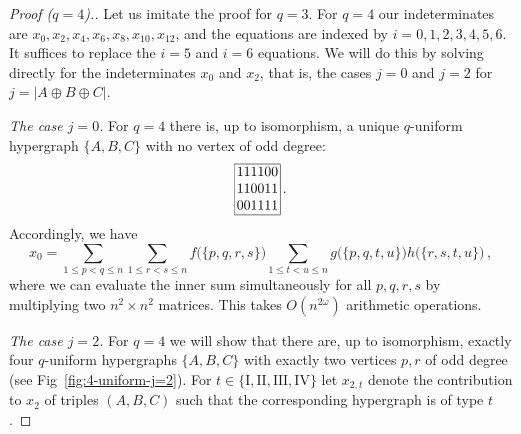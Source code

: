 \documentclass{amsart}
\begin{document}
\begin{proof}[Proof ($q=4$).]
Let us imitate the proof for $q=3$.
For $q=4$ our indeterminates are $x_0,x_2,x_4,x_6,x_8,x_{10},x_{12}$, 
and the equations are indexed by $i=0,1,2,3,4,5,6$. 
It suffices to replace the $i=5$ and $i=6$ equations. 
We will do this by solving directly for
the indeterminates $x_0$ and $x_2$, that is, the cases $j=0$ and $j=2$
for $j=|A\oplus B\oplus C|$.

{\em The case $j=0$.}
For $q=4$ there is, up to isomorphism, a unique 
$q$-uniform hypergraph $\{A,B,C\}$ with no vertex of odd degree:
\[
\begin{array}{|@{\,}c@{\,}|}
\hline
111100\\
110011\\
001111\\
\hline
\end{array}\,.
\]
Accordingly, we have
\[
x_0=\sum_{1\leq p<q\leq n}\sum_{1\leq r<s\leq n}f\bigl(\{p,q,r,s\}\bigr)\sum_{1\leq t<u\leq n}g\bigl(\{p,q,t,u\}\bigr)h\bigl(\{r,s,t,u\}\bigr)\,,
\]
where we can evaluate the inner sum simultaneously for all $p,q,r,s$ 
by multiplying two $n^2\times n^2$ matrices. This takes $O(n^{2\omega})$
arithmetic operations.



{\em The case $j=2$.}
For $q=4$ we will show that there are, up to isomorphism, exactly four 
$q$-uniform hypergraphs $\{A,B,C\}$ with exactly two
vertices $p,r$ of odd degree (see Fig~\ref{fig:4-uniform-j=2}).
For $t\in \{\mathrm{I},\mathrm{II},\mathrm{III},\mathrm{IV}\}$ let $x_{2,t}$ denote the contribution to $x_2$ of triples $(A,B,C)$ such that the corresponding hypergraph is of type $t$.


\end{proof}
\end{document}
